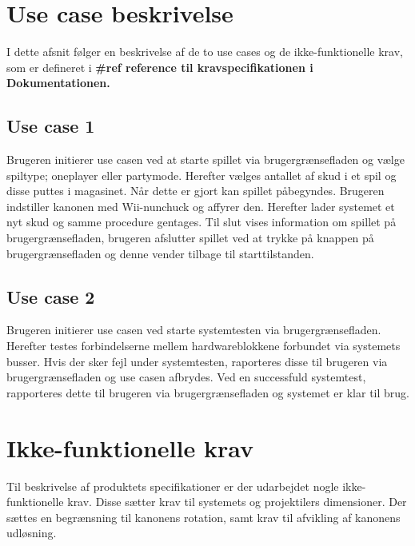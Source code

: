 \newpage
\section{Use case beskrivelse}
I dette afsnit følger en beskrivelse af de to use cases og de ikke-funktionelle krav, som er defineret i \textbf{\#ref reference til kravspecifikationen i Dokumentationen.}
\subsection{Use case 1}
Brugeren initierer use casen ved at starte spillet via brugergrænsefladen og vælge spiltype; oneplayer eller partymode. Herefter vælges antallet af skud i et spil og disse puttes i magasinet. Når dette er gjort kan spillet påbegyndes. Brugeren indstiller kanonen med Wii-nunchuck og affyrer den. Herefter lader systemet et nyt skud og samme procedure gentages. Til slut vises information om spillet på brugergrænsefladen, brugeren afslutter spillet ved at trykke på knappen på brugergrænsefladen og denne vender tilbage til starttilstanden. 

\subsection{Use case 2}
Brugeren initierer use casen ved starte systemtesten via brugergrænsefladen. Herefter testes forbindelserne mellem hardwareblokkene forbundet via systemets busser. Hvis der sker fejl under systemtesten, raporteres disse til brugeren via brugergrænsefladen og use casen afbrydes. Ved en successfuld systemtest, rapporteres dette til brugeren via brugergrænsefladen og systemet er klar til brug.

\section{Ikke-funktionelle krav}
Til beskrivelse af produktets specifikationer er der udarbejdet nogle ikke-funktionelle krav. Disse sætter krav til systemets og projektilers dimensioner. Der sættes en begrænsning til kanonens rotation, samt krav til afvikling af kanonens udløsning.  








